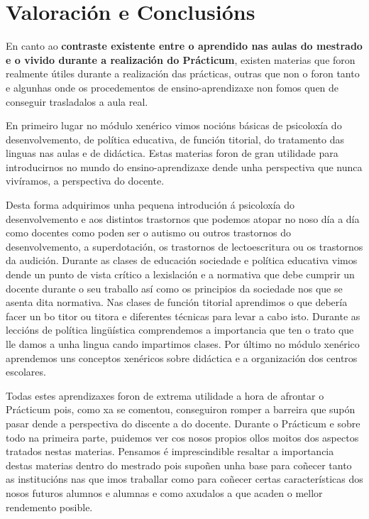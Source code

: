 

\chapter{Valoración e Conclusións}\label{chap:valoracion}




En canto ao \textbf{contraste existente entre o aprendido nas aulas do mestrado e o vivido durante a realización do Prácticum}, existen materias que foron realmente útiles durante a realización das prácticas, outras que non o foron tanto e algunhas onde os procedementos de ensino-aprendizaxe non fomos quen de conseguir trasladalos a aula real.

En primeiro lugar no módulo xenérico vimos nocións básicas de psicoloxía do desenvolvemento, de política educativa, de función titorial, do tratamento das linguas nas aulas e de didáctica. Estas materias foron de gran utilidade para introducirnos no mundo do ensino-aprendizaxe dende unha perspectiva que nunca vivíramos, a perspectiva do docente.

Desta forma adquirimos unha pequena introdución á psicoloxía do desenvolvemento e aos distintos trastornos que podemos atopar no noso día a día como docentes como poden ser o autismo ou outros trastornos do desenvolvemento, a superdotación, os trastornos de lectoescritura ou os trastornos da audición. Durante as clases de educación sociedade e política educativa vimos dende un punto de vista crítico a lexislación e a normativa que debe cumprir un docente durante o seu traballo así como os principios da sociedade nos que se asenta dita normativa. Nas clases de función titorial aprendimos o que debería facer un bo titor ou titora e diferentes técnicas para levar a cabo isto. Durante as leccións de política lingüística comprendemos a importancia que ten o trato que lle damos a unha lingua cando impartimos clases. Por último no módulo xenérico aprendemos uns conceptos xenéricos sobre didáctica e a organización dos centros escolares.

Todas estes aprendizaxes foron de extrema utilidade a hora de afrontar o Prácticum pois, como xa se comentou, conseguiron romper a barreira que supón pasar dende a perspectiva do discente a do docente. Durante o Prácticum e sobre todo na primeira parte, puidemos ver cos nosos propios ollos moitos dos aspectos tratados nestas materias. Pensamos é imprescindible resaltar a importancia destas materias dentro do mestrado pois supoñen unha base para coñecer tanto as institucións nas que imos traballar como para coñecer certas características dos nosos futuros alumnos e alumnas e como axudalos a que acaden o mellor rendemento posible.

